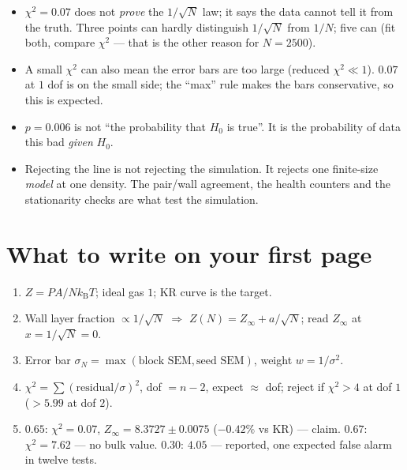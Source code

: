 \documentclass[11pt,a4paper]{article}
\newcommand{\kT}{k_{\mathrm B}T}
\begin{document}
\begin{wrong}
\begin{itemize}[nosep]
\item $\chi^2 = 0.07$ does not \emph{prove} the $1/\sqrt N$ law; it says the data cannot tell it from the truth. Three points can hardly distinguish $1/\sqrt N$ from $1/N$; five can (fit both, compare $\chi^2$ --- that is the other reason for $N = 2500$).
\item A small $\chi^2$ can also mean the error bars are too large (reduced $\chi^2\ll1$). $0.07$ at $1$ dof is on the small side; the ``max'' rule makes the bars conservative, so this is expected.
\item $p = 0.006$ is not ``the probability that $H_0$ is true''. It is the probability of data this bad \emph{given} $H_0$.
\item Rejecting the line is not rejecting the simulation. It rejects one finite-size \emph{model} at one density. The pair/wall agreement, the health counters and the stationarity checks are what test the simulation.
\end{itemize}
\end{wrong}

\section{What to write on your first page}
\begin{enumerate}[nosep]
\item $Z = PA/N\kT$; ideal gas $1$; KR curve is the target.
\item Wall layer fraction $\propto 1/\sqrt N$ $\Rightarrow$ $Z(N) = Z_\infty + a/\sqrt N$; read $Z_\infty$ at $x = 1/\sqrt N = 0$.
\item Error bar $\sigma_N = \max(\text{block SEM}, \text{seed SEM})$, weight $w = 1/\sigma^2$.
\item $\chi^2 = \sum(\text{residual}/\sigma)^2$, dof $= n - 2$, expect $\approx$ dof; reject if $\chi^2>4$ at dof $1$ ($>5.99$ at dof $2$).
\item $0.65$: $\chi^2 = 0.07$, $Z_\infty = 8.3727\pm0.0075$ ($-0.42\%$ vs KR) --- claim. $0.67$: $\chi^2 = 7.62$ --- no bulk value. $0.30$: $4.05$ --- reported, one expected false alarm in twelve tests.
\end{enumerate}
\end{document}
